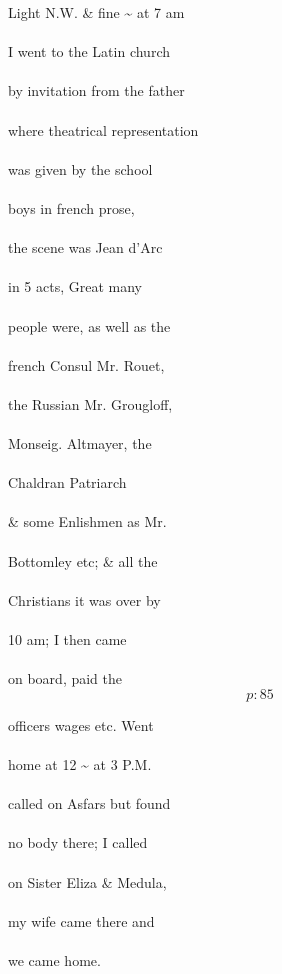\documentclass{report}
\begin{document}
	\par{
 	Light N.W. \& fine \~{} at 7 am\ \\\ \\I went to the Latin church\ \\\ \\by invitation from the father\ \\\ \\where theatrical representation\ \\\ \\was given by the school\ \\\ \\boys in french prose,\ \\\ \\the scene was Jean d’Arc\ \\\ \\in 5 acts, Great many\ \\\ \\people were, as well as the\ \\\ \\french Consul Mr. Rouet,\ \\\ \\the Russian Mr. Grougloff,\ \\\ \\Monseig. Altmayer, the\ \\\ \\Chaldran Patriarch\ \\\ \\\& some Enlishmen as Mr.\ \\\ \\Bottomley etc; \& all the\ \\\ \\Christians it was over by\ \\\ \\10 am; I then came\ \\\ \\on board, paid the\ \\
  \[p: 85 \]

	}



	\par{
 	officers wages etc. Went\ \\\ \\home at 12 \~{} at 3 P.M.\ \\\ \\called on Asfars but found\ \\\ \\no body there; I called\ \\\ \\on Sister Eliza \& Medula,\ \\\ \\my wife came there and\ \\\ \\we came home.\ \\\ \\
	}
\end{document}
